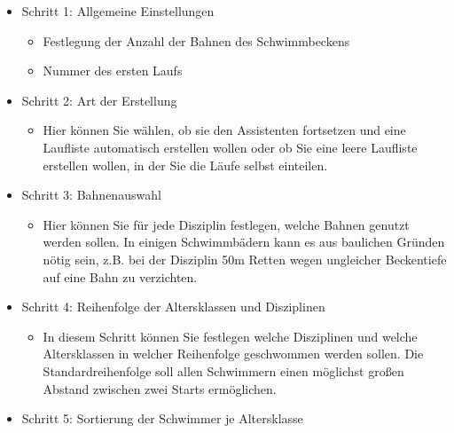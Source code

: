 \documentclass[11pt,a4paper,twoside,ngerman]{article}
\begin{document}
\begin{itemize}

\item Schritt 1: Allgemeine Einstellungen
\begin{itemize}

\item Festlegung der Anzahl der Bahnen des Schwimmbeckens


\item Nummer des ersten Laufs


\end{itemize}



\item Schritt 2: Art der Erstellung
\begin{itemize}

\item Hier können Sie wählen, ob sie den Assistenten fortsetzen und eine Laufliste automatisch erstellen wollen oder ob Sie eine leere Laufliste erstellen wollen, in der Sie die Läufe selbst einteilen.


\end{itemize}



\item Schritt 3: Bahnenauswahl
\begin{itemize}

\item Hier können Sie für jede Disziplin festlegen, welche Bahnen genutzt werden sollen. In einigen Schwimmbädern kann es aus baulichen Gründen nötig sein, z.B. bei der Disziplin \glqq{}50m Retten\grqq{} wegen ungleicher Beckentiefe auf eine Bahn zu verzichten.


\end{itemize}



\item Schritt 4: Reihenfolge der Altersklassen und Disziplinen
\begin{itemize}

\item In diesem Schritt können Sie festlegen welche Disziplinen und welche Altersklassen in welcher Reihenfolge geschwommen werden sollen. Die Standardreihenfolge soll allen Schwimmern einen möglichst großen Abstand zwischen zwei Starts ermöglichen.


\end{itemize}



\item Schritt 5: Sortierung der Schwimmer je Altersklasse
\begin{itemize}


\end{itemize}
\end{itemize}
\end{document}
